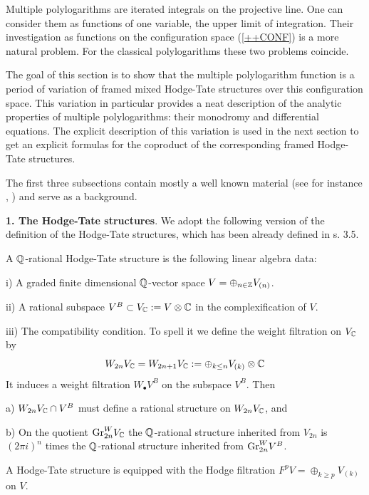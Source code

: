 \documentclass[10pt]{article}
\begin{document}
Multiple polylogarithms are iterated integrals 
on the projective line. One can consider them as functions of one variable, the 
upper limit of integration. 
Their investigation 
as functions on the configuration space (\ref{++CONF}) is a 
more natural problem. 
For the classical polylogarithms these two problems coincide. 

The goal of this section is to  show that the 
multiple polylogarithm function is a period  of variation of framed mixed 
Hodge-Tate structures over this configuration space. This variation in particular  
 provides a neat description 
of the analytic  properties of multiple polylogarithms: 
their monodromy  and differential equations. 
The explicit description of this variation is used in the next section to get 
 an explicit formulas for 
the coproduct of the 
corresponding framed Hodge-Tate structures. 


The first three subsections contain mostly a well known material 
(see for instance \cite{D}, \cite{H}) and 
serve as a background. 


{\bf 1. The Hodge-Tate  structures}. We 
adopt the following version of the  definition of the  Hodge-Tate structures,  
which has been already 
defined in 
s. 3.5. 

A ${\mathbb Q}$-rational Hodge-Tate structure is  the following 
linear algebra data: 

i) A graded finite dimensional ${\mathbb Q}$-vector space $V = \oplus_{n\in {\mathbb Z}} V_{(n)}$.

ii) A rational subspace $V^B \subset V_{{\mathbb C}}:= V\otimes {\mathbb C}$ in the 
complexification of $V$.

iii) The compatibility condition. To spell it we define the weight 
filtration on $V_{{\mathbb C}}$ by 
$$
W_{2n}V_{{\mathbb C}} = W_{2n+1}V_{{\mathbb C}}:= \oplus_{k \leq n} V_{(k)}\otimes {\mathbb C}
$$
It induces  a weight filtration $W_{\bullet}V^B$ on the subspace $V^B$. 
Then 

a) $W_{2n}V_{{\mathbb C}} \cap V^B$ must define a rational structure on 
$W_{2n}V_{{\mathbb C}}$, and 

b) On the quotient ${\rm Gr}^W_{2n}V_{{\mathbb C}}$ the ${\mathbb Q}$-rational 
structure inherited from $V_{2n}$ is $(2\pi i)^n$ times the ${\mathbb Q}$-rational 
structure inherited from ${\rm Gr}^W_{2n}V^{B}$. 

A Hodge-Tate structure is equipped with the Hodge filtration $
F^pV = \oplus_{k \geq p}V_{(k)}$ on $V$. 

\end{document}
